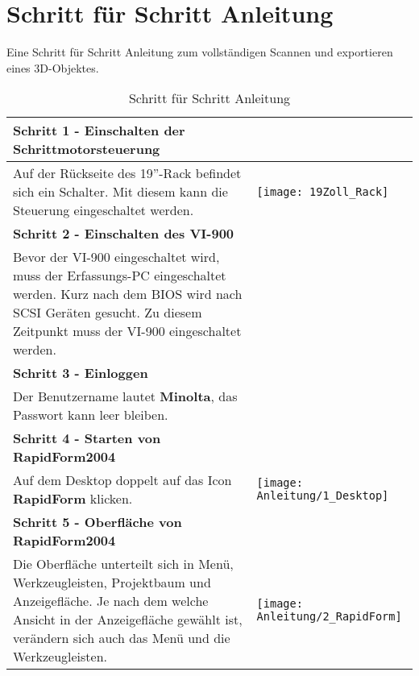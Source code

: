 \section{Schritt für Schritt Anleitung}
\label{sec:StepbyStep}
Eine Schritt für Schritt Anleitung zum vollständigen Scannen und exportieren eines 3D-Objektes.

\begin{longtable}{|>{\RaggedRight}m{5cm}|m{8cm}|} 
\caption{Schritt für Schritt Anleitung} 
\label{tab:StepbyStep}
\\ \hline



\multicolumn{2}{|l|}%
{{\textbf{Schritt 1 - Einschalten der Schrittmotorsteuerung}}}
\\ \hline
Auf der Rückseite des 19''-Rack befindet sich ein Schalter. Mit diesem kann die Steuerung eingeschaltet werden.
& 
\texttt{[image: 19Zoll\_Rack]}
\\ \hline 

\multicolumn{2}{|l|}%
{{\textbf{Schritt 2 - Einschalten des VI-900}}}
\\ \hline
\multicolumn{2}{|p{13cm}|}%
{Bevor der VI-900 eingeschaltet wird, muss der Erfassungs-PC eingeschaltet werden. Kurz nach dem BIOS wird nach SCSI Geräten gesucht. Zu diesem Zeitpunkt muss der VI-900 eingeschaltet werden.}
\\ \hline 
 
\multicolumn{2}{|l|}%
{{\textbf{Schritt 3 - Einloggen}}}
\\ \hline
\multicolumn{2}{|l|}%
{{Der Benutzername lautet \textbf{Minolta}, das Passwort kann leer bleiben.}}
\\ \hline  
 
\multicolumn{2}{|l|}%
{{\textbf{Schritt 4 - Starten von RapidForm2004}}}
\\ \hline
Auf dem Desktop doppelt auf das Icon \textbf{RapidForm} klicken.
& 
\texttt{[image: Anleitung/1\_Desktop]}
\\ \hline 
\newpage
\multicolumn{2}{|l|}%
{{\textbf{Schritt 5 - Oberfläche von RapidForm2004}}}
\\ \hline
Die Oberfläche unterteilt sich in Menü, Werkzeugleisten, Projektbaum und Anzeigefläche.
Je nach dem welche Ansicht in der Anzeigefläche gewählt ist, verändern sich auch das Menü und die Werkzeugleisten. 
& 
\texttt{[image: Anleitung/2\_RapidForm]}
\\ \hline  


\end{longtable}
